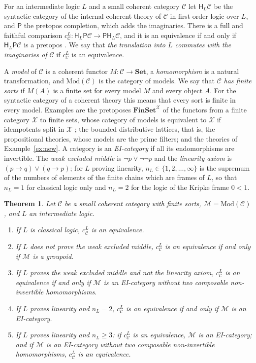 \documentclass[11pt]{amsart}
\newtheorem{thm}{Theorem}[section]
\theoremstyle{definition}
\newcommand{\Set}{\mathbf{Set}}
\newcommand{\Fin}{\mathbf{FinSet}}
\newcommand{\Mod}{\mathrm{Mod}}
\newcommand{\PP}{\mathsf P}
\newcommand{\HH}{\mathsf H}
\newcommand{\cX}{\mathcal X}
\newcommand{\cC}{\mathcal C}
\newcommand{\cM}{\mathcal M}
\begin{document}
For an intermediate logic $L$ and a small coherent category $\cC$ let
$\HH_L\cC$ be the syntactic category of the internal coherent theory of
$\cC$ in first-order logic over $L$, and $\PP$ the pretopos completion,
which adds the imaginaries. There is a full and faithful comparison
$c^L_\cC\colon\HH_L\PP\cC\to\PP\HH_L\cC$, and it is an equivalence if
and only if $\HH_L\PP\cC$ is a pretopos \cite[Lemma~2.2]{Interm}. We
say that \emph{the translation into $L$ commutes with the imaginaries
of $\cC$} if $c^L_\cC$ is an equivalence.

A \emph{model} of $\cC$ is a coherent functor $M\colon\cC\to\Set$, a
\emph{homomorphism} is a natural transformation, and $\Mod(\cC)$ is
the category of models. We say that $\cC$ \emph{has finite sorts} if
$M(A)$ is a finite set for every model $M$ and every object $A$. For
the syntactic category of a coherent theory this means that every
sort is finite in every model. Examples are the pretoposes $\Fin^{\cX}$
of the functors from a finite category $\cX$ to finite sets, whose
category of models is equivalent to $\cX$ if idempotents split in
$\cX$
\cite[\S7]{Heyting}; the bounded distributive lattices, that is, the
propositional theories, whose models are the prime filters; and the
theories of Example~\ref{ex:new}. A category is an \emph{EI-category}
if all its endomorphisms are invertible. The \emph{weak excluded
middle} is $\neg p\vee\neg\neg p$ and the \emph{linearity axiom} is
$(p\to q)\vee(q\to p)$; for $L$ proving linearity, $n_L\in\{1,2,\dots,
\infty\}$ is the supremum of the numbers of elements of the finite
chains which are frames of $L$, so that $n_L=1$ for classical logic
only and $n_L=2$ for the logic of the Kripke frame $0<1$.

\begin{thm}\label{thm:main}
Let $\cC$ be a small coherent category with finite sorts, $\cM=
\Mod(\cC)$, and $L$ an intermediate logic.
\begin{enumerate}
\item[(1)] If $L$ is classical logic, $c^L_\cC$ is an equivalence.
\item[(2)] If $L$ does not prove the weak excluded middle, $c^L_\cC$ is
an equivalence if and only if $\cM$ is a groupoid.
\item[(3)] If $L$ proves the weak excluded middle and not the
linearity axiom, $c^L_\cC$ is an equivalence if and only if $\cM$ is
an EI-category without two composable non-invertible homomorphisms.
\item[(4)] If $L$ proves linearity and $n_L=2$, $c^L_\cC$ is an
equivalence if and only if $\cM$ is an EI-category.
\item[(5)] If $L$ proves linearity and $n_L\ge3$: if $c^L_\cC$ is an
equivalence, $\cM$ is an EI-category; and if $\cM$ is an EI-category
without two composable non-invertible homomorphisms, $c^L_\cC$ is an
equivalence.
\end{enumerate}
\end{thm}
\end{document}

